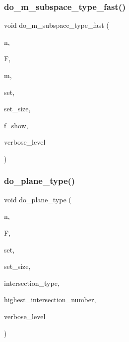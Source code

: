 \subsubsection{\texorpdfstring{do\+\_\+m\+\_\+subspace\+\_\+type\+\_\+fast()}{do\_m\_subspace\_type\_fast()}}
{\footnotesize\ttfamily void do\+\_\+m\+\_\+subspace\+\_\+type\+\_\+fast (\begin{DoxyParamCaption}\item[{\mbox{\hyperlink{galois_8h_a09fddde158a3a20bd2dcadb609de11dc}{I\+NT}}}]{n,  }\item[{\mbox{\hyperlink{classfinite__field}{finite\+\_\+field}} $\ast$}]{F,  }\item[{\mbox{\hyperlink{galois_8h_a09fddde158a3a20bd2dcadb609de11dc}{I\+NT}}}]{m,  }\item[{\mbox{\hyperlink{galois_8h_a09fddde158a3a20bd2dcadb609de11dc}{I\+NT}} $\ast$}]{set,  }\item[{\mbox{\hyperlink{galois_8h_a09fddde158a3a20bd2dcadb609de11dc}{I\+NT}}}]{set\+\_\+size,  }\item[{\mbox{\hyperlink{galois_8h_a09fddde158a3a20bd2dcadb609de11dc}{I\+NT}}}]{f\+\_\+show,  }\item[{\mbox{\hyperlink{galois_8h_a09fddde158a3a20bd2dcadb609de11dc}{I\+NT}}}]{verbose\+\_\+level }\end{DoxyParamCaption})}

\mbox{\label{geometric__operations_8_c_a886f1d0c92a60be97721430f1b10b2ac}} 
\subsubsection{\texorpdfstring{do\+\_\+plane\+\_\+type()}{do\_plane\_type()}}
{\footnotesize\ttfamily void do\+\_\+plane\+\_\+type (\begin{DoxyParamCaption}\item[{\mbox{\hyperlink{galois_8h_a09fddde158a3a20bd2dcadb609de11dc}{I\+NT}}}]{n,  }\item[{\mbox{\hyperlink{classfinite__field}{finite\+\_\+field}} $\ast$}]{F,  }\item[{\mbox{\hyperlink{galois_8h_a09fddde158a3a20bd2dcadb609de11dc}{I\+NT}} $\ast$}]{set,  }\item[{\mbox{\hyperlink{galois_8h_a09fddde158a3a20bd2dcadb609de11dc}{I\+NT}}}]{set\+\_\+size,  }\item[{\mbox{\hyperlink{galois_8h_a09fddde158a3a20bd2dcadb609de11dc}{I\+NT}} $\ast$\&}]{intersection\+\_\+type,  }\item[{\mbox{\hyperlink{galois_8h_a09fddde158a3a20bd2dcadb609de11dc}{I\+NT}} \&}]{highest\+\_\+intersection\+\_\+number,  }\item[{\mbox{\hyperlink{galois_8h_a09fddde158a3a20bd2dcadb609de11dc}{I\+NT}}}]{verbose\+\_\+level }\end{DoxyParamCaption})}

